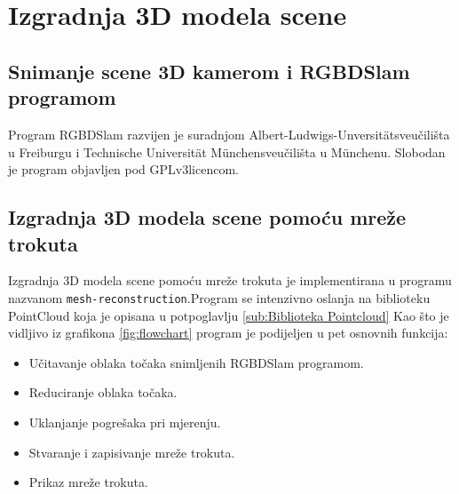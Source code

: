 \newpage
\setcounter{figure}{0}

\section{Izgradnja 3D modela scene} %
\label{sec:Izgradnja 3D modela scene}

\subsection{Snimanje scene 3D kamerom i RGBDSlam programom} %
\label{sub:Snimanje scene 3D kamerom i RGBDSlam programom}
Program RGBDSlam razvijen je suradnjom
Albert-Ludwigs-Unversität\footnotemark[6] sveučilišta u Freiburgu i
Technische Universität München\footnotemark[7] sveučilišta u Münchenu.
Slobodan je program objavljen pod GPLv3\footnotemark[8] licencom.



\newpage
\subsection{Izgradnja 3D modela scene pomoću mreže trokuta} %
\label{sub:Izgradnja 3D modela scene pomoću mreže trokuta}

Izgradnja 3D modela scene pomoću mreže trokuta je implementirana u
programu nazvanom \texttt{mesh-reconstruction}.\footnotemark[1]
Program se intenzivno oslanja na biblioteku PointCloud koja je opisana u
potpoglavlju \ref{sub:Biblioteka Pointcloud} Kao što je vidljivo iz
grafikona \ref{fig:flowchart} program je podijeljen u pet osnovnih
funkcija:
\begin{itemize}
    \item Učitavanje oblaka točaka snimljenih RGBDSlam programom.
    \item Reduciranje oblaka točaka.
    \item Uklanjanje pogrešaka pri mjerenju.
    \item Stvaranje i zapisivanje mreže trokuta.
    \item Prikaz mreže trokuta.
\end{itemize}


